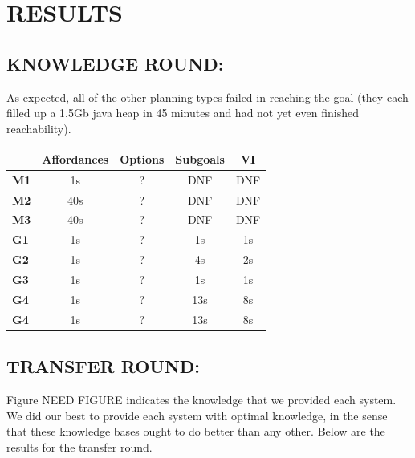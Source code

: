 \documentclass[]{article}
\begin{document}


%

\section{RESULTS}

\subsection{KNOWLEDGE ROUND:}

As expected, all of the other planning types failed in reaching the goal (they each filled up a 1.5Gb java heap in 45 minutes and had not yet even finished reachability).

\begin{tabular}{ l || c | c | c | c }
  & Affordances & Options & Subgoals & VI \\
  \hline
  {\bf M1} & 1s & ? & DNF & DNF  \\
  {\bf M2} & 40s & ? & DNF & DNF \\
  {\bf M3} & 40s & ? & DNF & DNF \\
  {\bf G1} & 1s & ? & 1s & 1s \\
  {\bf G2} & 1s & ? & 4s & 2s \\
  {\bf G3} & 1s & ? & 1s & 1s \\
  {\bf G4} & 1s & ? & 13s & 8s \\
  {\bf G4} & 1s & ? & 13s & 8s \\
\end{tabular}


\subsection{TRANSFER ROUND:}

Figure NEED FIGURE indicates the knowledge that we provided each system. We did our best to provide each system with optimal knowledge, in the sense that these knowledge bases ought to do better than any other. Below are the results for the transfer round.
\end{document}

